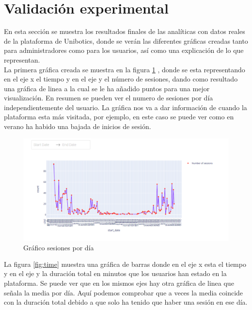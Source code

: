 \section{Validación experimental}

En esta sección se muestra los resultados finales de las analíticas con datos reales de la plataforma de Unibotics, donde se verán las diferentes gráficas creadas tanto para administradores como para los usuarios, así como una explicación de lo que representan.\\

La primera gráfica creada se muestra en la figura \ref{fig:sesion} , donde se esta representando en el eje x el tiempo y en el eje y el número de sesiones, dando como resultado una gráfica de linea a la cual se le ha añadido puntos para una mejor visualización. En resumen se pueden ver el numero de sesiones por día independientemente del usuario. La gráfica nos va a dar información de cuando la plataforma esta más visitada, por ejemplo,  en este caso se puede ver como en verano ha habido una bajada de inicios de sesión.



\begin{figure}[H]
    \centering
    \includegraphics[width=19cm, keepaspectratio]{img/sesion.png}
    \caption{Gráfico sesiones por día}
    \label{fig:sesion}
\end{figure}
\newpage
La figura \ref{fig:time} muestra una gráfica de barras donde en el eje x esta el tiempo y en el eje y la duración total en minutos que los usuarios han estado en la plataforma. Se puede ver que en los mismos ejes hay otra gráfica de linea que señala la media por día. Aquí podemos comprobar que a veces la media coincide con la duración total debido a que solo ha tenido que haber una sesión en ese día.



